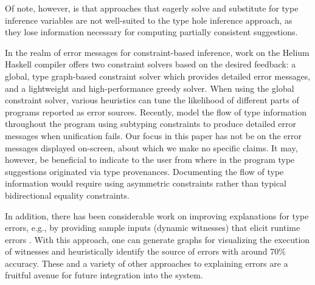 Of note, however, is that approaches that eagerly solve and substitute for type inference variables \cite{odersky1999,pottier2014,mcadam1999} are not well-suited to the type hole inference approach, as they lose information necessary for computing partially consistent suggestions. 


In the realm of error messages for constraint-based inference, work on the Helium Haskell compiler \cite{heeren2003} offers two constraint solvers based on the desired feedback: a global, type graph-based constraint solver which provides detailed error messages, and a lightweight and high-performance greedy solver. When using the global constraint solver, various heuristics can tune the likelihood of different parts of programs reported as error sources.
Recently, \citet{bhanuka2023} model the flow of type information throughout the program using subtyping constraints to produce detailed error messages when unification fails.
Our focus in this paper has not be on the error messages displayed on-screen, about which we make no specific claims.
It may, however, be beneficial to indicate to the user from where in the program type suggestions originated via type provenances. Documenting the flow of type information would require using asymmetric constraints rather than typical bidirectional equality constraints. 

In addition, there has been considerable work on improving explanations for type errors, e.g., by providing sample inputs (dynamic witnesses) that elicit runtime errors \cite{seidel2016}. With this approach, one can generate graphs for visualizing the execution of witnesses and heuristically identify the source of errors with around 70\% accuracy.
These and a variety of other approaches to explaining errors are a fruitful avenue for future integration into the system.
